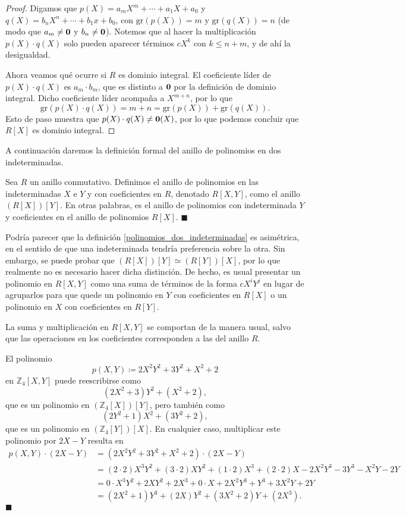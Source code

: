 \begin{proof}
Digamos que $p(X) = a_mX^m + \cdots + a_1X + a_0$ y $q(X) = b_nX^n + \cdots + b_1x+b_0$, con $\mathrm{gr}(p(X)) = m$ y $\mathrm{gr}(q(X)) = n$ (de modo que $a_m \neq \mathbf{0}$ y $b_n \neq \mathbf{0}$). Notemos que al hacer la multiplicación $p(X) \cdot q(X)$ solo pueden aparecer términos $c X^k$ con $k \leq n + m$, y de ahí la desigualdad.

Ahora veamos qué ocurre si $R$ es dominio integral. El coeficiente líder de $p(X) \cdot q(X)$ es $a_m \cdot b_m$, que es distinto a $\mathbf{0}$ por la definición de dominio integral. Dicho coeficiente líder acompaña a $X^{m+n}$, por lo que 
$$\mathrm{gr}(p(X) \cdot q(X)) = m + n = \mathrm{gr}(p(X)) + \mathrm{gr}(q(X)).$$
Esto de paso muestra que $p(X) \cdot q(X) \neq \mathbf{0}(X)$, por lo que podemos concluir que $R[X]$ es dominio integral.
\end{proof}

A continuación daremos la definición formal del anillo de polinomios en dos indeterminadas.

\begin{definition} \label{polinomios_dos_indeterminadas}
Sea $R$ un anillo conmutativo. Definimos el anillo de polinomios en las indeterminadas $X$ e $Y$ y con coeficientes en $R$, denotado $R[X, Y]$, como el anillo $(R[X])[Y]$. En otras palabras, es el anillo de polinomios con indeterminada $Y$ y coeficientes en el anillo de polinomios $R[X]$.
\hfill$\blacksquare$
\end{definition}

Podría parecer que la definición \ref{polinomios_dos_indeterminadas} es asimétrica, en el sentido de que una indeterminada tendría preferencia sobre la otra. Sin embargo, se puede probar que $(R[X])[Y] \simeq (R[Y])[X]$, por lo que realmente no es necesario hacer dicha distinción. De hecho, es usual presentar un polinomio en $R[X,Y]$ como una suma de términos de la forma $c X^i Y^j$ en lugar de agruparlos para que quede un polinomio en $Y$ con coeficientes en $R[X]$ o un polinomio en $X$ con coeficientes en $R[Y]$. 

La suma y multiplicación en $R[X,Y]$ se comportan de la manera usual, salvo que las operaciones en los coeficientes corresponden a las del anillo $R$.

\begin{example}
El polinomio $$p(X, Y) \coloneqq 2X^2Y^2 + 3Y^2 + X^2 + 2$$ en $\mathbb{Z}_4[X,Y]$ puede reescribirse como $$(2X^2 + 3)Y^2 + (X^2+2),$$ que es un polinomio en $(\mathbb{Z}_4[X])[Y]$, pero también como $$(2Y^2 + 1)X^2 + (3Y^2 + 2),$$ que es un polinomio en $(\mathbb{Z}_4[Y])[X]$. En cualquier caso, multiplicar este polinomio por $2X-Y$ resulta en
\begin{align*}
p(X, Y) \cdot (2X-Y) &=
(2X^2Y^2 + 3Y^2 + X^2 + 2) \cdot (2X-Y) \\ &= (2 \cdot 2)X^3Y^2 + (3 \cdot 2)XY^2 + (1 \cdot 2)X^3 + (2 \cdot 2)X - 2X^2Y^3 - 3Y^3 - X^2Y - 2Y \\
&= 0 \cdot X^3Y^2 + 2XY^2 + 2X^3 + 0 \cdot X + 2X^2Y^3 + Y^3 + 3X^2Y + 2Y \\
&= (2X^2 + 1)Y^3 + (2X)Y^2 + (3X^2 + 2)Y + (2X^3).
\end{align*}
\hfill$\blacksquare$
\end{example}